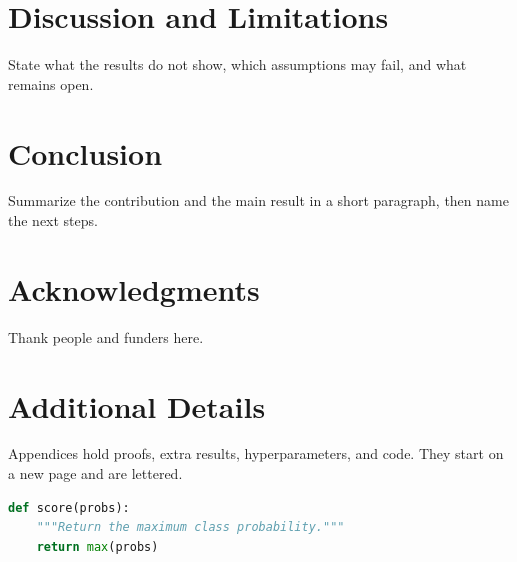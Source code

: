 \documentclass[twocolumn]{ulpaper}
\begin{document}
\section{Discussion and Limitations}
\label{sec:limitations}

State what the results do not show, which assumptions may fail, and what remains open.

\section{Conclusion}
\label{sec:conclusion}

Summarize the contribution and the main result in a short paragraph, then name the next steps.

\section*{Acknowledgments}
Thank people and funders here.



\appendix

\section{Additional Details}
\label{app:details}

Appendices hold proofs, extra results, hyperparameters, and code. They start on a new page and are lettered.

\begin{lstlisting}[language=Python, caption={Code listings use the class style.}, label={lst:example}]
def score(probs):
    """Return the maximum class probability."""
    return max(probs)
\end{lstlisting}
\end{document}
